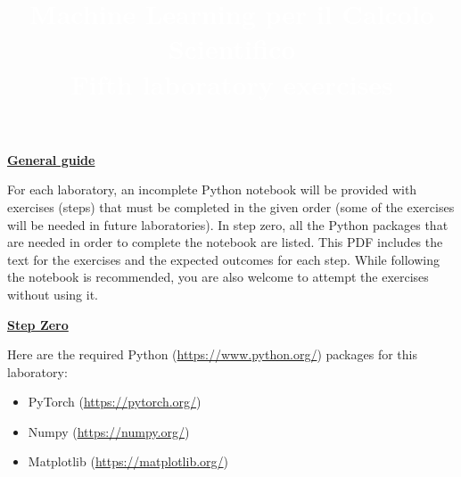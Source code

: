 \documentclass{article}
\title{\textcolor{white}{\textbf{Machine Learning per il Calcolo Scientifico}\\ \small\textbf{Fifth laboratory exercises }}}
\date{}
\newcommand{\step}[1]{\underline{\textbf{\large{#1}}} }
\begin{document}
\AddToShipoutPicture*
{%
  \AtPageUpperLeft
  {%
    \color{bluunipv}%
    \raisebox{-.1\paperheight}{\rule{\paperwidth}{.5\paperheight}}%

  }%
}

\maketitle

\begin{center}\step{General guide} \end{center}
\noindent
For each laboratory, an incomplete Python notebook will be provided with exercises (steps) that must be completed in the given order (some of the exercises will be needed in future laboratories). In step zero, all the Python packages that are needed in order to complete the notebook are listed. This PDF includes the text for the exercises and the expected outcomes for each step. While following the notebook is recommended, you are also welcome to attempt the exercises without using it.

\begin{center}\step{Step Zero} \end{center}

Here are the required Python (\url{https://www.python.org/}) packages for this laboratory:
\begin{itemize}
  \item PyTorch (\url{https://pytorch.org/})
  \item Numpy (\url{https://numpy.org/})
  \item Matplotlib (\url{https://matplotlib.org/})
\end{itemize}
\end{document}
